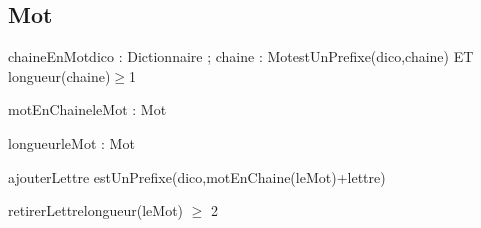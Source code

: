 \subsection{Mot}
\begin{algorithme}
  \signatureFonctionAvecPreconditions
  {chaineEnMot}{dico : Dictionnaire ; chaine : \chaine}{Mot}{estUnPrefixe(dico,chaine) ET longueur(chaine)$\geq$1}

  \signaturefonction
  {motEnChaine}{leMot : Mot}{\chaine}

  \signaturefonction
  {longueur}{leMot : Mot}{\naturelNonNul}

  \signatureProcedureAvecPreconditions
  {ajouterLettre}{ }{estUnPrefixe(dico,motEnChaine(leMot)+lettre)}

  \signatureProcedureAvecPreconditions
  {retirerLettre}{}{longueur(leMot) $\geq$ 2}

\end{algorithme}
